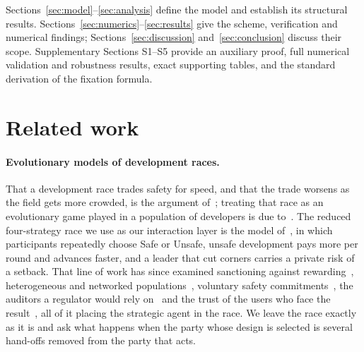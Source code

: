 \documentclass[a4paper,fleqn]{cas-sc}
\begin{document}
Sections~\ref{sec:model}--\ref{sec:analysis} define the model and establish its
structural results. Sections~\ref{sec:numerics}--\ref{sec:results} give the
scheme, verification and numerical findings;
Sections~\ref{sec:discussion} and~\ref{sec:conclusion} discuss their scope.
Supplementary Sections S1--S5 provide an auxiliary proof, full numerical
validation and robustness results, exact supporting tables, and the standard
derivation of the fixation formula.

\section{Related work}
\label{sec:related}

\paragraph{Evolutionary models of development races.}
That a development race trades safety for speed, and that the trade worsens as
the field gets more crowded, is the argument of~\citet{armstrong2016racing};
treating that race as an evolutionary game played in a population of developers
is due to~\citet{han2020regulate}. The reduced four-strategy race we use as our
interaction layer is the model of~\citet{domingos2026falling}, in which
participants repeatedly choose Safe or Unsafe, unsafe development pays more per
round and advances faster, and a leader that cut corners carries a private risk
of a setback. That line of work has since examined sanctioning against
rewarding~\citep{han2021mediating}, heterogeneous and networked
populations~\citep{cimpeanu2022heterogeneous}, voluntary safety
commitments~\citep{han2022voluntary}, the auditors a regulator would rely
on~\citep{bova2024vigilant} and the trust of the users who face the
result~\citep{bashir2026trust}, all of it placing the strategic agent in the
race. We leave the race exactly as it is and ask what happens when the party
whose design is selected is several hand-offs removed from the party that acts.
\end{document}
